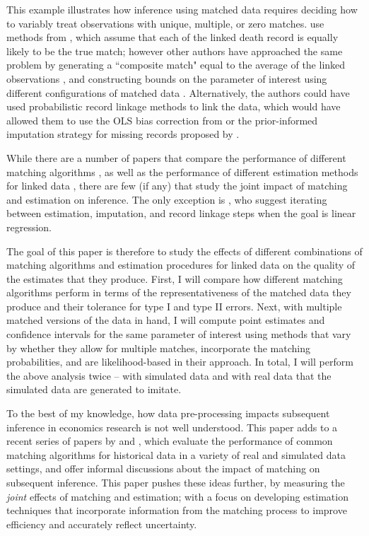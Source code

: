 \documentclass[12pt]{article}
\begin{document}
This example illustrates how inference using matched data requires deciding how to variably treat observations with unique, multiple, or zero matches.  \cite{aizer2016} use methods from \cite{ahl2019}, which assume that each of the linked death record is equally likely to be the true match; however other authors have approached the same problem by generating a ``composite match" equal to the average of the linked observations \citep{bleakley2016}, and constructing bounds on the parameter of interest using different configurations of matched data \citep{nq2015}.   Alternatively, the authors could have used probabilistic record linkage methods to link the data, which would have allowed them to use the OLS bias correction from \cite{lahiri05} or the prior-informed imputation strategy for missing records proposed by \cite{Goldstein2012}.  

While there are a number of papers that compare the performance of different matching algorithms  \citep{bailey2017, arp2018}, as well as the performance of different estimation methods for linked data \citep{harron2014}, there are few (if any) that study the joint impact of matching and estimation on inference.  The only exception is \cite{sw1997}, who suggest iterating between estimation, imputation, and record linkage steps when the goal is linear regression. 

The goal of this paper is therefore to study the effects of different combinations of matching algorithms and estimation procedures for linked data on the quality of the estimates that they produce.  First, I will compare how different matching algorithms perform in terms of the representativeness of the matched data they produce and their tolerance for type I and type II errors.  Next, with multiple matched versions of the data in hand, I will compute point estimates and confidence intervals for the same parameter of interest using methods that vary by whether they allow for multiple matches, incorporate the matching probabilities, and are likelihood-based in their approach.  In total, I will perform the above analysis twice -- with simulated data and with real data that the simulated data are generated to imitate.  

To the best of my knowledge, how data pre-processing impacts subsequent inference in economics research is not well understood.  This paper adds to a recent series of papers by  \cite{bailey2017} and \cite{arp2018, abe2019}, which evaluate the performance of common matching algorithms for historical data in a variety of real and simulated data settings, and offer informal discussions about the impact of matching on subsequent inference.  This paper pushes these ideas further, by measuring the \textit{joint} effects of matching and estimation; with a focus on developing estimation techniques that incorporate information from the matching process to improve efficiency and accurately reflect uncertainty. 
\end{document}
